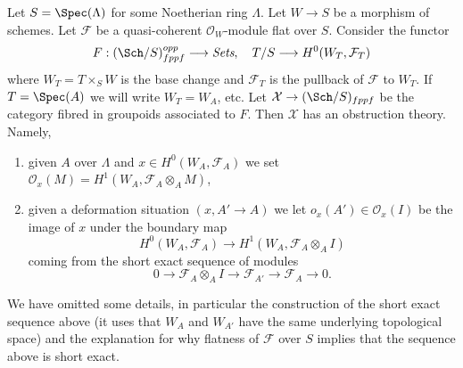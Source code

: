 \begin{example}
\label{example-global-sections}
Let $S = \Spec(\Lambda)$ for some Noetherian ring $\Lambda$.
Let $W \to S$ be a morphism of schemes. Let $\mathcal{F}$
be a quasi-coherent $\mathcal{O}_W$-module flat over $S$.
Consider the functor
$$
F : (\Sch/S)_{fppf}^{opp} \longrightarrow \textit{Sets},
\quad
T/S \longrightarrow H^0(W_T, \mathcal{F}_T)
$$
where $W_T = T \times_S W$ is the base change and $\mathcal{F}_T$ is
the pullback of $\mathcal{F}$ to $W_T$. If $T = \Spec(A)$
we will write $W_T = W_A$, etc. Let $\mathcal{X} \to (\Sch/S)_{fppf}$
be the category fibred in groupoids associated to $F$. Then
$\mathcal{X}$ has an obstruction theory. Namely,
\begin{enumerate}
\item given $A$ over $\Lambda$ and
$x \in H^0(W_A, \mathcal{F}_A)$ we set
$\mathcal{O}_x(M) = H^1(W_A, \mathcal{F}_A \otimes_A M)$,
\item given a deformation situation $(x, A' \to A)$ we let
$o_x(A') \in \mathcal{O}_x(I)$ be the image of $x$ under the boundary map
$$
H^0(W_A, \mathcal{F}_A) \longrightarrow H^1(W_A, \mathcal{F}_A \otimes_A I)
$$
coming from the short exact sequence of modules
$$
0 \to \mathcal{F}_A \otimes_A I \to
\mathcal{F}_{A'} \to \mathcal{F}_A \to 0.
$$
\end{enumerate}
We have omitted some details, in particular the construction of the short
exact sequence above (it uses that $W_A$ and $W_{A'}$ have the same
underlying topological space) and the explanation for why flatness
of $\mathcal{F}$ over $S$ implies that the sequence above is short exact.
\end{example}

